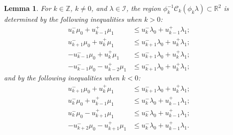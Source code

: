 \documentclass{amsart}
\newtheorem{lemma}[theorem]{Lemma}
\numberwithin{theorem}{section}
\newcommand{\cC}{\mathcal{C}}
\newcommand{\cI}{\mathcal{I}}
\newcommand{\RR}{\mathbb{R}}
\newcommand{\ZZ}{\mathbb{Z}}
\begin{document}
  \begin{lemma}
    \label{le:dominance inequalities}
    For $k\in\ZZ$, $k\ne0$, and $\lambda\in\cI$, the region $\phi_k^{-1}\cC_k(\phi_k\lambda)\subset\RR^2$ is determined by the following inequalities when $k>0$:
    \begin{align}
      \label{ineq:1} u_k^-\mu_0+u_{k-1}^+\mu_1 &\le u_k^-\lambda_0+u_{k-1}^+\lambda_1;\\
      \label{ineq:2} u_{k+1}^-\mu_0+u_k^+\mu_1 &\le u_{k+1}^-\lambda_0+u_k^+\lambda_1;\\
      \label{ineq:3} -u_{k-1}^-\mu_0+u_k^+\mu_1 &\le u_{k+1}^-\lambda_0+u_k^+\lambda_1;\\
      \label{ineq:4} -u_{k-1}^-\mu_0-u_{k-2}^+\mu_1 &\le u_{k+1}^-\lambda_0+u_k^+\lambda_1;
    \end{align}
    and by the following inequalities when $k<0$:
    \begin{align*}
      u_{k+1}^-\mu_0+u_k^+\mu_1 &\le u_{k+1}^-\lambda_0+u_k^+\lambda_1;\\
      u_k^-\mu_0+u_{k-1}^+\mu_1 &\le u_k^-\lambda_0+u_{k-1}^+\lambda_1;\\
      u_k^-\mu_0-u_{k+1}^+\mu_1 &\le u_k^-\lambda_0+u_{k-1}^+\lambda_1;\\
      -u_{k+2}^-\mu_0-u_{k+1}^+\mu_1 &\le u_k^-\lambda_0+u_{k-1}^+\lambda_1.
    \end{align*}
    

\end{lemma}
\end{document}
